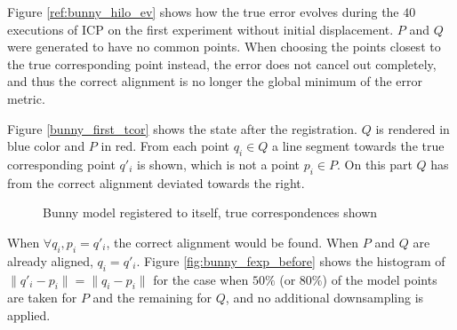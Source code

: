 Figure \ref{ref:bunny_hilo_ev} shows how the true error evolves during the $40$ executions of ICP on the first experiment without initial displacement. $P$ and $Q$ were generated to have no common points. When choosing the points closest to the true corresponding point instead, the error does not cancel out completely, and thus the correct alignment is no longer the global minimum of the error metric.

Figure \ref{bunny_first_tcor} shows the state after the registration. $Q$ is rendered in blue color and $P$ in red. From each point $q_i \in Q$ a line segment towards the true corresponding point $q'_i$ is shown, which is not a point $p_i \in P$. On this part $Q$ has from the correct alignment deviated towards the right.

\begin{figure}[p]
\centering
{
	\setlength{\fboxsep}{0pt}%
	\setlength{\fboxrule}{0.5pt}%
}
\caption{Bunny model registered to itself, true correspondences shown}
\label{fig:bunny_first_tcor}
\end{figure}

When $\forall q_i, p_i = q'_i$, the correct alignment would be found. When $P$ and $Q$ are already aligned, $q_i = q'_i$. Figure \ref{fig:bunny_fexp_before} shows the histogram of $\|q'_i - p_i\| = \|q_i - p_i\|$ for the case when $50\%$ (or $80\%$) of the model points are taken for $P$ and the remaining for $Q$, and no additional downsampling is applied.

